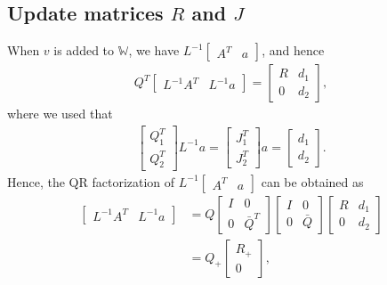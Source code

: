 \documentclass[12pt,a4paper]{article}
\begin{document}
\subsection{Update matrices $R$ and $J$}

When $v$ is added to $\mathbb{W}$, we have $L^{-1} \begin{bmatrix} A^T &
  a \end{bmatrix}$, and hence
%
\begin{align}
  Q^T\begin{bmatrix} L^{-1}A^T & L^{-1}a \end{bmatrix} =
  \begin{bmatrix} R & d_1 \\ 0 & d_2 \end{bmatrix},
\end{align}
%
where we used that
%
\begin{align}
\begin{bmatrix} Q_1^T \\ Q_2^T \end{bmatrix} L^{-1}a =
\begin{bmatrix} J_1^T \\ J_2^T \end{bmatrix} a =
\begin{bmatrix} d_1 \\ d_2 \end{bmatrix}.
\end{align}
%
Hence, the QR factorization of $L^{-1} \begin{bmatrix} A^T & a \end{bmatrix}$
can be obtained as
%
\begin{align}
  \begin{bmatrix} L^{-1}A^T & L^{-1}a \end{bmatrix} &=
  Q\begin{bmatrix} I & 0 \\ 0 & \bar{Q}^T \end{bmatrix}
  \begin{bmatrix} I & 0 \\ 0 & \bar{Q} \end{bmatrix}
  \begin{bmatrix} R & d_1 \\ 0 & d_2 \end{bmatrix} \\
  &= Q_{+}
  \begin{bmatrix} R_{+} \\ 0 \end{bmatrix},
\end{align}
\end{document}
